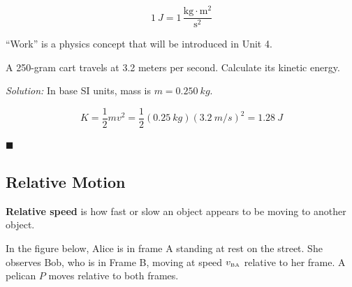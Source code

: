 \documentclass[dvipsnames]{article}
\begin{document}
\begin{equation*}
    \SI{1}{J} = 1\,\mathrm{\frac{kg\cdot m^2}{s^2}}
\end{equation*}

``Work'' is a physics concept that will be introduced in Unit 4.

\begin{example}
A 250-gram cart travels at 3.2 meters per second. Calculate its kinetic energy. 
\end{example}

\textit{Solution:}
In base SI units, mass is $m = \SI{0.250}{kg}$.

\begin{equation*}
    K = \frac{1}{2} mv^2 = \frac{1}{2}(\SI{0.25}{kg})(\SI{3.2}{m/s})^2 = \boxed{\SI{1.28}{J}} 
\end{equation*}

\hfill $\blacksquare$

\subsection{Relative Motion}





\textbf{Relative speed} is how fast or slow an object appears to be moving to another object.



In the figure below, Alice is in frame A standing at rest on the street. She observes Bob, who is in Frame B, moving at speed $v_\text{\tiny BA}$ relative to her frame. A pelican $P$ moves relative to both frames.
\end{document}
